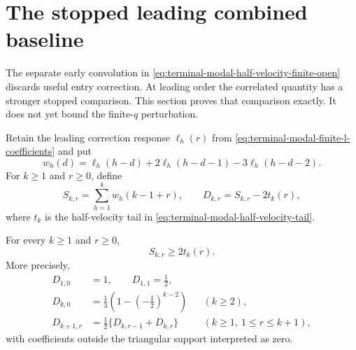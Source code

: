 \section{The stopped leading combined baseline}
\label{sec:terminal-modal-stopped-baseline}

The separate early convolution in
\eqref{eq:terminal-modal-half-velocity-finite-open} discards useful entry
correction.  At leading order the correlated quantity has a stronger stopped
comparison.  This section proves that comparison exactly.  It does not yet
bound the finite-$q$ perturbation.

Retain the leading correction response $\ell_h(r)$ from
\eqref{eq:terminal-modal-finite-l-coefficients} and put
\begin{equation}
 w_h(d)=\ell_h(h-d)+2\ell_h(h-d-1)-3\ell_h(h-d-2).
 \label{eq:terminal-modal-stopped-leading-w}
\end{equation}
For $k\ge1$ and $r\ge0$, define
\begin{equation}
 S_{k,r}=\sum_{h=1}^k w_h(k-1+r),
 \qquad D_{k,r}=S_{k,r}-2t_k(r),
 \label{eq:terminal-modal-stopped-leading-SD}
\end{equation}
where $t_k$ is the half-velocity tail in
\eqref{eq:terminal-modal-half-velocity-tail}.

\begin{lemma}
\label{lem:terminal-modal-stopped-tail-domination}
For every $k\ge1$ and $r\ge0$,
\begin{equation}
 S_{k,r}\ge2t_k(r).
 \label{eq:terminal-modal-stopped-tail-domination}
\end{equation}
More precisely,
\begin{align}
 D_{1,0}&=1,\qquad D_{1,1}=\frac12,
 \label{eq:terminal-modal-stopped-tail-bases}\\
 D_{k,0}&=\frac13\left(1-\left(-\frac12\right)^{k-2}\right)
 &&(k\ge2),
 \label{eq:terminal-modal-stopped-tail-axis}\\
 D_{k+1,r}&=\frac12\{D_{k,r-1}+D_{k,r}\}
 &&(k\ge1,\ 1\le r\le k+1),
 \label{eq:terminal-modal-stopped-tail-Pascal}
\end{align}
with coefficients outside the triangular support interpreted as zero.
\end{lemma}


